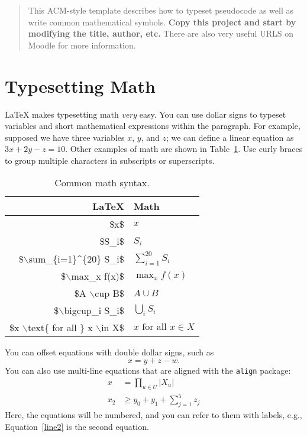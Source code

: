 \documentclass{sig-alternate-05-2015}
\begin{document}
\maketitle

\begin{abstract}
This ACM-style template describes how to typeset pseudocode as well as write common mathematical symbols.  \textbf{Copy this project and start by modifying the title, author, etc.}  There are also very useful URLS on Moodle for more information.
\end{abstract}



\section{Typesetting Math}

LaTeX makes typesetting math \textit{very} easy.  You can use dollar signs to typeset variables and short mathematical expressions within the paragraph.  For example, supposed we have three variables $x$, $y$, and $z$; we can define a linear equation as $3x+2y-z=10$.  Other examples of math are shown in Table~\ref{math}.  Use curly braces to group multiple characters in subscripts or superscripts.

\begin{table}[h]  
\centering
\begin{tabular}{r|l}  %
LaTeX & Math \\ \hline
\$x\$ & $x$ \\
\$S\_i\$ & $S_i$ \\
\$$\backslash$sum\_\{i=1\}\^{}\{20\} S\_i\$ & $\sum_{i=1}^{20} S_i$ \\
\$$\backslash$max\_x f(x)\$ & $\max_x f(x)$ \\
\$A $\backslash$cup B\$ & $A \cup B$ \\
\$$\backslash$bigcup\_i S\_i\$ & $\bigcup_i S_i$ \\
\$x $\backslash$text\{ for all \} x $\backslash$in X\$ & $x \text{ for all } x \in X$ \\
\end{tabular}\caption{Common math syntax.} 
\label{math}
\end{table}

You can offset equations with double dollar signs, such as 
$$x=y+z-w.$$
You can also use multi-line equations that are aligned with the \texttt{align} package:
\begin{align}
x &= \prod_{u \in U} |X_u| \\
x_2 & \geq y_0 + y_1 + \sum_{j=1}^5 z_j \label{line2}
\end{align}
Here, the equations will be numbered, and you can refer to them with labels, e.g., Equation~\eqref{line2} is the second equation.
\end{document}
